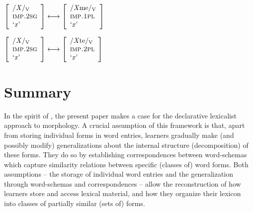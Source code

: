 \documentclass[output=paper,colorlinks,citecolor=brown]{langscibook}
\begin{document}
\ea\label{ex:ruleIMP_1PL}
$\left[
\begin{array}{l}
    \text{/\textit{X}/\textsubscript{V}} \\
    \textsc{imp.2sg} \\
    \text{`\textit{x}'}
\end{array}
\right] 
\longleftrightarrow
\left[
\begin{array}{l}
    \text{/\textit{X}me/\textsubscript{V}} \\
    \textsc{imp.1pl} \\
    \text{`\textit{x}'}
\end{array}
\right] $
\z

\ea\label{ex:ruleIMP_2PL}
$\left[
\begin{array}{l}
    \text{/\textit{X}/\textsubscript{V}} \\
    \textsc{imp.2sg} \\
    \text{`\textit{x}'}
\end{array}
\right] 
\longleftrightarrow
\left[
\begin{array}{l}
    \text{/\textit{X}te/\textsubscript{V}} \\
    \textsc{imp.2pl} \\
    \text{`\textit{x}'}
\end{array}
\right] $
\z


\section{Summary}\label{sec:Summary}

In the spirit of \citet{Zimmermann2019}, the present paper makes a case for the declarative lexicalist approach to morphology. A crucial assumption of this framework is that, apart from storing individual forms in word entries, learners gradually make (and possibly modify) generalizations about the internal structure (decomposition) of these forms. They do so by establishing correspondences between word-schemas which capture similarity relations between specific (classes of) word forms. Both assumptions -- the storage of individual word entries and the generalization through word-schemas and correspondences -- allow the reconstruction of how learners store and access lexical material, and how they organize their lexicon into classes of partially similar (sets of) forms. 
\end{document}

